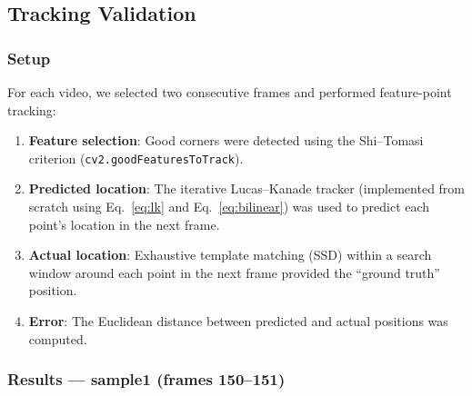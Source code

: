 \documentclass[12pt, a4paper]{article}
\begin{document}
\subsection{Tracking Validation}

\subsubsection{Setup}

For each video, we selected two consecutive frames and performed feature-point tracking:

\begin{enumerate}
  \item \textbf{Feature selection}: Good corners were detected using the Shi--Tomasi criterion (\texttt{cv2.goodFeaturesToTrack}).
  \item \textbf{Predicted location}: The iterative Lucas--Kanade tracker (implemented from scratch using Eq.~\eqref{eq:lk} and Eq.~\eqref{eq:bilinear}) was used to predict each point's location in the next frame.
  \item \textbf{Actual location}: Exhaustive template matching (SSD) within a search window around each point in the next frame provided the ``ground truth'' position.
  \item \textbf{Error}: The Euclidean distance between predicted and actual positions was computed.
\end{enumerate}

\subsubsection{Results --- sample1 (frames 150--151)}
\end{document}
